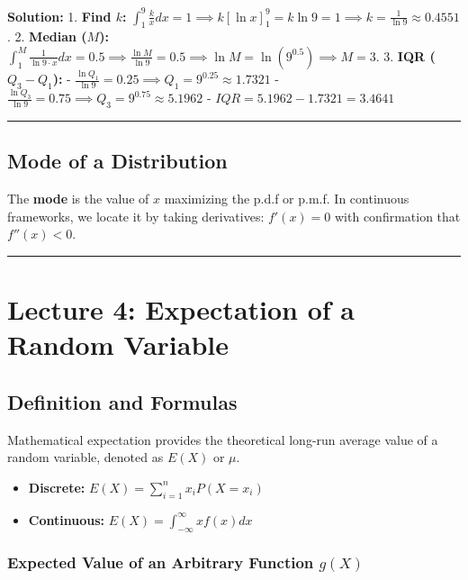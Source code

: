 \documentclass[
]{article}
\providecommand{\tightlist}{%
  \setlength{\itemsep}{0pt}\setlength{\parskip}{0pt}}
\begin{document}
\textbf{Solution:} 1. \textbf{Find \(k\):}
\(\int_{1}^{9} \frac{k}{x} dx = 1 \implies k [\ln x]_1^9 = k \ln 9 = 1 \implies k = \frac{1}{\ln 9} \approx 0.4551\).
2. \textbf{Median (\(M\)):}
\(\int_{1}^{M} \frac{1}{\ln 9 \cdot x} dx = 0.5 \implies \frac{\ln M}{\ln 9} = 0.5 \implies \ln M = \ln(9^{0.5}) \implies M = 3\).
3. \textbf{IQR (\(Q_3 - Q_1\)):} -
\(\frac{\ln Q_1}{\ln 9} = 0.25 \implies Q_1 = 9^{0.25} \approx 1.7321\)
-
\(\frac{\ln Q_3}{\ln 9} = 0.75 \implies Q_3 = 9^{0.75} \approx 5.1962\)
- \(IQR = 5.1962 - 1.7321 = 3.4641\)

\begin{center}\rule{0.5\linewidth}{0.5pt}\end{center}

\subsection{Mode of a Distribution}\label{mode-of-a-distribution}

The \textbf{mode} is the value of \(x\) maximizing the p.d.f or p.m.f.
In continuous frameworks, we locate it by taking derivatives:
\(f'(x) = 0\) with confirmation that \(f''(x) < 0\).

\begin{center}\rule{0.5\linewidth}{0.5pt}\end{center}

\section{Lecture 4: Expectation of a Random
Variable}\label{lecture-4-expectation-of-a-random-variable}

\subsection{Definition and Formulas}\label{definition-and-formulas}

Mathematical expectation provides the theoretical long-run average value
of a random variable, denoted as \(E(X)\) or \(\mu\).

\begin{itemize}
\tightlist
\item
  \textbf{Discrete:} \(E(X) = \sum_{i=1}^{n} x_i P(X = x_i)\)
\item
  \textbf{Continuous:} \(E(X) = \int_{-\infty}^{\infty} x f(x) dx\)
\end{itemize}

\subsubsection{\texorpdfstring{Expected Value of an Arbitrary Function
\(g(X)\)}{Expected Value of an Arbitrary Function g(X)}}\label{expected-value-of-an-arbitrary-function-gx}
\end{document}
